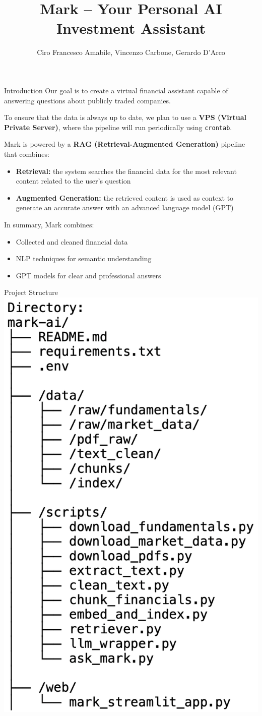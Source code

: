 \documentclass[aspectratio=169,xcolor=dvipsnames]{beamer}
\title[Mark -- AI Investment Assistant]{Mark -- Your Personal AI Investment Assistant}
\author{Ciro Francesco Amabile, Vincenzo Carbone, Gerardo D'Arco}
\date{}
\begin{document}
\frame{\titlepage}

\begin{frame}{Introduction}
  Our goal is to create a virtual financial assistant capable of answering questions about publicly traded companies.\\
  \vspace{0.1cm}
  
  To ensure that the data is always up to date, we plan to use a \textbf{VPS (Virtual Private Server)}, where the pipeline will run periodically using \texttt{crontab}.
  
  \vspace{0.1cm}
  Mark is powered by a \textbf{RAG (Retrieval-Augmented Generation)} pipeline that combines:
  \begin{itemize}
      \item \textbf{Retrieval:} the system searches the financial data for the most relevant content related to the user's question
      \item \textbf{Augmented Generation:} the retrieved content is used as context to generate an accurate answer with an advanced language model (GPT)
  \end{itemize}
  
  \vspace{0.1cm}
  In summary, Mark combines:
  \begin{itemize}
      \item Collected and cleaned financial data
      \item NLP techniques for semantic understanding
      \item GPT models for clear and professional answers
  \end{itemize}
\end{frame}
  

\begin{frame}{Project Structure}
  \centering
  \includegraphics[width=0.33\linewidth]{directory.png}
  \end{frame}
  
\end{document}

